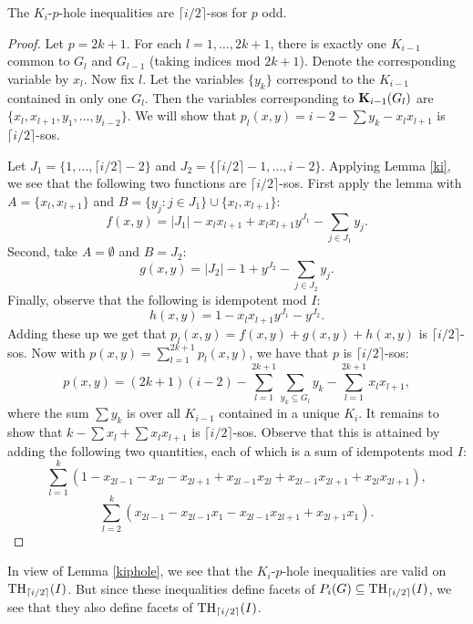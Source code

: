 \begin{lemma}\label{kiphole}
The $K_i$-$p$-hole inequalities are $\lceil i/2 \rceil$-sos for $p$ odd.
\end{lemma}
\begin{proof}

Let $p = 2k+1$. For each $l=1,\ldots,2k+1$, there is exactly one $K_{i-1}$
common to $G_l$ and $G_{l-1}$ (taking indices mod $2k+1$). Denote the
corresponding variable by $x_l$. Now fix $l$. Let the variables $\{y_k\}$
correspond to the $K_{i-1}$ contained in only one $G_l$. Then the variables corresponding to $\mathbf{K}_{i-1}(G_l)$ are $\{x_l,x_{l+1},y_1,\ldots,y_{i-2}\}$. We will show that $p_l(x,y) = i-2 - \sum y_k - x_lx_{l+1}$ is $\lceil i/2 \rceil$-sos.

Let $J_1 = \{1,\ldots,\lceil i/2 \rceil - 2\}$ and $J_2 = \{\lceil i/2 \rceil -
1, \ldots,i-2\}$. Applying Lemma \ref{ki}, we see that the following two functions are $\lceil i/2 \rceil$-sos. First apply the lemma with $A = \{x_l,x_{l+1}\}$ and $B = \{y_j: j \in J_1\} \cup \{x_l,x_{l+1}\}$:
$$f(x,y)=|J_1| - x_lx_{l+1} + x_lx_{l+1}y^{J_1}- \sum_{j \in J_1} y_j .$$
Second, take $A = \emptyset$ and $B = J_2$:
$$g(x,y)=|J_2| - 1  + y^{J_2}- \sum_{j \in J_2} y_j .$$
Finally, observe that the following is idempotent mod $I$:
$$h(x,y) = 1-x_lx_{l+1}y^{J_1} - y^{J_2}.$$
Adding these up we get that $p_l(x,y) = f(x,y)+g(x,y)+h(x,y)$ is $\lceil i/2 \rceil$-sos. Now with $p(x,y) = \sum_{l=1}^{2k+1} p_l(x,y)$, we have that $p$ is $\lceil i/2 \rceil$-sos:
$$p(x,y) = (2k+1)(i-2) - \sum_{l=1}^{2k+1}\sum_{y_k \subseteq G_l}y_k - \sum_{l=1}^{2k+1}x_lx_{l+1},$$
where the sum $\sum y_k$ is over all $K_{i-1}$ contained in a unique $K_i$. It
remains to show that $k-\sum x_l + \sum x_lx_{l+1}$ is $\lceil i/2 \rceil$-sos.
Observe that this is attained by adding the following two quantities, each of
which is a sum of idempotents mod $I$:
$$ \sum_{l=1}^k \left(1 - x_{2l-1} - x_{2l} - x_{2l+1} + x_{2l-1}x_{2l} +
x_{2l-1}x_{2l+1} + x_{2l}x_{2l+1}\right),$$
$$ \sum_{l=2}^k (x_{2l-1} - x_{2l-1}x_{1} - x_{2l-1}x_{2l+1} + x_{2l+1}x_{1}).$$
\end{proof}

In view of Lemma \ref{kiphole}, we see that the $K_i$-$p$-hole inequalities are
valid on $\textup{TH}_{\lceil i/2 \rceil}(I)$. But since these inequalities define
facets of $P_i(G) \subseteq \textup{TH}_{\lceil i/2 \rceil}(I)$, we see that they also
define facets of $\textup{TH}_{\lceil i/2 \rceil}(I)$.

